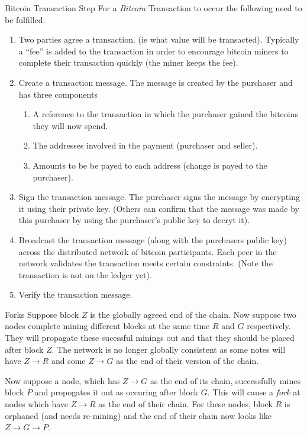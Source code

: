 \documentclass[11pt,a4paper]{article}
\begin{document}
  \begin{proposition}{Bitcoin Transaction Step}
    For a \textit{Bitcoin} Transaction to occur the following need to be fulfilled.
    \begin{enumerate}
      \item Two parties agree a transaction. (ie what value will be transacted). Typically a ``fee'' is added to the transaction in order to encourage bitcoin miners to complete their transaction quickly (the miner keeps the fee).
      \item Create a transaction message. The message is created by the purchaser and has three components
      \begin{enumerate}
        \item A reference to the transaction in which the purchaser gained the bitcoins they will now spend.
        \item The addresses involved in the payment (purchaser and seller).
        \item Amounts to be be payed to each address (change is payed to the purchaser).
      \end{enumerate}
      \item Sign the transaction message. The purchaser signs the message by encrypting it using their private key. (Others can confirm that the message was made by this purchaser by using the purchaser's public key to decryt it).
      \item Broadcast the transaction message (along with the purchasers public key) across the distributed network of bitcoin participants. Each peer in the network validates the transaction meets certain constraints. (Note the transaction is not on the ledger yet).
      \item Verify the transaction message.
    \end{enumerate}
  \end{proposition}

  \begin{remark}{Forks}
    Suppose block $Z$ is the globally agreed end of the chain. Now suppose two nodes complete mining different blocks at the same time $R$ and $G$ respectively. They will propagate these sucessful minings out and that they should be placed after block $Z$. The network is no longer globally consistent as some notes will have $Z\to R$ and some $Z\to G$ as the end of their version of the chain.
    \par Now suppose a node, which has $Z\to G$ as the end of its chain, successfully mines block $P$ and propogates it out as occuring after block $G$. This will cause a \textit{fork} at nodes which have $Z\to R$ as the end of their chain. For these nodes, block $R$ is orphaned (and needs re-mining) and the end of their chain now looks like $Z\to G\to P$.
  \end{remark}
\end{document}
